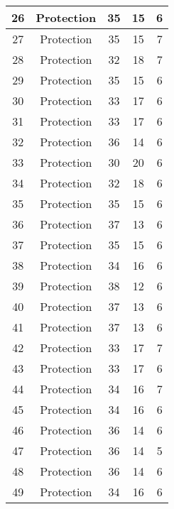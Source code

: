 \documentclass[results.tex]{subfiles}
\begin{document}
\begin{center}
\begin{tabular}{| c || c | c | c | c |}
    \hline
    26 & Protection & 35 & 15 & 6 \\ 
    \hline
    27 & Protection & 35 & 15 & 7 \\ 
    \hline
    28 & Protection & 32 & 18 & 7 \\ 
    \hline
    29 & Protection & 35 & 15 & 6 \\ 
    \hline
    30 & Protection & 33 & 17 & 6 \\ 
    \hline
    31 & Protection & 33 & 17 & 6 \\ 
    \hline
    32 & Protection & 36 & 14 & 6 \\ 
    \hline
    33 & Protection & 30 & 20 & 6 \\ 
    \hline
    34 & Protection & 32 & 18 & 6 \\ 
    \hline
    35 & Protection & 35 & 15 & 6 \\ 
    \hline
    36 & Protection & 37 & 13 & 6 \\ 
    \hline
    37 & Protection & 35 & 15 & 6 \\ 
    \hline
    38 & Protection & 34 & 16 & 6 \\ 
    \hline
    39 & Protection & 38 & 12 & 6 \\ 
    \hline
    40 & Protection & 37 & 13 & 6 \\ 
    \hline
    41 & Protection & 37 & 13 & 6 \\ 
    \hline
    42 & Protection & 33 & 17 & 7 \\ 
    \hline
    43 & Protection & 33 & 17 & 6 \\ 
    \hline
    44 & Protection & 34 & 16 & 7 \\ 
    \hline
    45 & Protection & 34 & 16 & 6 \\ 
    \hline
    46 & Protection & 36 & 14 & 6 \\ 
    \hline
    47 & Protection & 36 & 14 & 5 \\ 
    \hline
    48 & Protection & 36 & 14 & 6 \\ 
    \hline
    49 & Protection & 34 & 16 & 6 \\ 
    \hline   \end{tabular}
\end{center}
\end{document}

